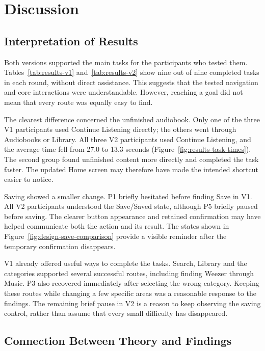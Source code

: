 \chapter{Discussion}
\label{chap:discussion}
\section{Interpretation of Results}
\label{sec:discussion-results}

Both versions supported the main tasks for the participants who tested
them. Tables~\ref{tab:results-v1} and~\ref{tab:results-v2} show nine out of
nine completed tasks in each round, without direct assistance. This suggests
that the tested navigation and core interactions were understandable.
However, reaching a goal did not mean that every route was equally easy
to find.

The clearest difference concerned the unfinished audiobook. Only one of
the three V1 participants used Continue Listening directly; the others went
through Audiobooks or Library. All three V2 participants used Continue
Listening, and the average time fell from 27.0 to 13.3 seconds
(Figure~\ref{fig:results-task-times}). The second group found unfinished
content more directly and completed the task faster. The updated Home
screen may therefore have made the intended shortcut easier to notice.

Saving showed a smaller change. P1 briefly hesitated before finding Save
in V1. All V2 participants understood the Save/Saved state, although P5
briefly paused before saving. The clearer button appearance and retained
confirmation may have helped communicate both the action and its result.
The states shown in Figure~\ref{fig:design-save-comparison} provide a
visible reminder after the temporary confirmation disappears.

V1 already offered useful ways to complete the tasks. Search, Library and
the categories supported several successful routes, including finding
Weezer through Music. P3 also recovered immediately after selecting the
wrong category. Keeping these routes while changing a few specific areas
was a reasonable response to the findings. The remaining brief pause in V2
is a reason to keep observing the saving control, rather than assume that
every small difficulty has disappeared.

\section{Connection Between Theory and Findings}
\label{sec:discussion-theory}

